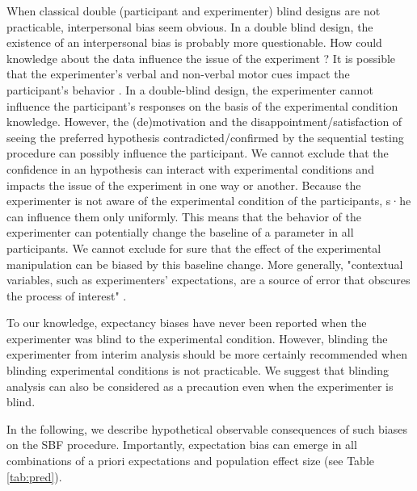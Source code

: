 \documentclass[a4paper,man,natbib,floatsintext,donotrepeattitle]{apa6}
\begin{document}
When classical double (participant and experimenter) blind designs are not practicable, interpersonal bias seem obvious. In a double blind design, the existence of an interpersonal bias is probably more questionable. How could knowledge about the data influence the issue of the experiment ? It is possible that the experimenter's verbal and non-verbal motor cues impact the participant's behavior \citep{zoble_interaction_1969}. In a double-blind design, the experimenter cannot influence the participant's responses on the basis of the experimental condition knowledge. However, the (de)motivation and the disappointment/satisfaction of seeing the preferred hypothesis contradicted/confirmed by the sequential testing procedure can possibly influence the participant. We cannot exclude that the confidence in an hypothesis can interact with experimental conditions and impacts the issue of the experiment in one way or another. Because the experimenter is not aware of the experimental condition of the participants, s·he can influence them only uniformly. This means that the behavior of the experimenter can potentially change the baseline of a parameter in all participants. We cannot exclude for sure that the effect of the experimental manipulation can be biased by this baseline change. More generally, "contextual variables, such as experimenters’ expectations, are a source of error that obscures the process of interest" \citep{klein_low_2012}.\par

To our knowledge, expectancy biases have never been reported when the experimenter was blind to the experimental condition. However, blinding the experimenter from interim analysis should be more certainly recommended \citep{lakens_performing_2014} when blinding experimental conditions is not practicable. We suggest that blinding analysis can also be considered as a precaution even when the experimenter is blind.

In the following, we describe hypothetical observable consequences of such biases on the SBF procedure. Importantly, expectation bias can emerge in all combinations of a priori expectations and population effect size (see Table \ref{tab:pred}).

\end{document}
